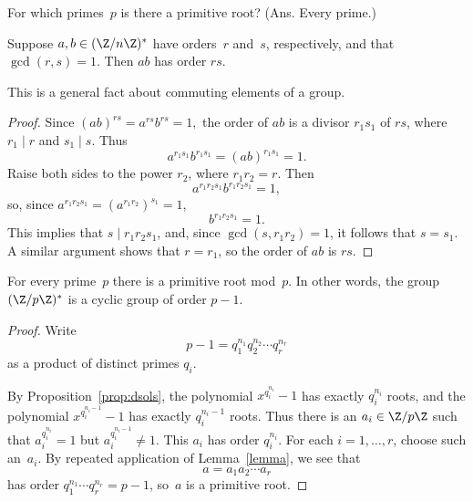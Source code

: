 \documentclass[11pt]{report}
\begin{document}
 For which primes~$p$ is there a primitive
root? (Ans. Every prime.)

\begin{lemma}\label{lemma}
  Suppose $a,b\in(\Z/n\Z)^*$ have orders~$r$ and~$s$, respectively,
  and that $\gcd(r,s)=1$.  Then $ab$ has order $rs$.
\end{lemma}
This is a general fact about commuting elements of a group.
\begin{proof}
  Since
  $
    (ab)^{rs} = a^{rs}b^{rs}=1,
  $ the order of $ab$ is a divisor $r_1 s_1$ of $rs$, where
  $r_1\mid r$ and $s_1\mid s$.
  Thus
  $$
    a^{r_1 s_1}b^{r_1 s_1} = (ab)^{r_1 s_1} = 1.
  $$
  Raise both sides to the power $r_2$, where $r_1 r_2 = r$.
  Then
  $$
    a^{r_1 r_2 s_1} b^{r_1 r_2 s_1} = 1,
  $$
  so, since $a^{r_1 r_2 s_1} = (a^{r_1 r_2})^{s_1} = 1$,
  $$
    b^{r_1 r_2 s_1} = 1.
  $$
  This implies that $s\mid r_1 r_2 s_1$,
  and, since $\gcd(s,r_1 r_2)=1$, it follows that $s=s_1$.
  A similar argument shows that $r=r_1$, so the order of $ab$ is $rs$.
\end{proof}




\begin{theorem}\label{theorem}
  For every prime~$p$ there is a primitive
  root mod~$p$.  In other words, the
  group $(\Z/p\Z)^*$ is a cyclic group
  of order $p-1$.
\end{theorem}
\begin{proof}
  Write
  $$
    p-1 = q_1^{n_1}q_2^{n_2}\cdots q_r^{n_r}
  $$
  as a product of distinct primes $q_i$.

  By Proposition~\ref{prop:dsols},
  the polynomial $x^{q_i^{n_i}}-1$ has exactly
  $q_i^{n_i}$ roots, and the polynomial
  $x^{q_i^{n_i-1}}-1$ has exactly
  $q_i^{n_i-1}$ roots.  Thus there is an $a_i\in\Z/p\Z$ such
  that $a_i^{q_i^{n_i}}=1$ but $a_i^{q_i^{n_i-1}}\neq 1$.
  This $a_i$ has order $q_i^{n_i}$.
  For each $i=1,\ldots, r$, choose such an~$a_i$.
  By repeated application of Lemma~\ref{lemma}, we see that
  $$
    a = a_1 a_2 \cdots a_r
  $$
  has order
  $q_1^{n_1}\cdots q_r^{n_r} = p-1$,
  so~$a$ is a primitive root.
\end{proof}
\end{document}
